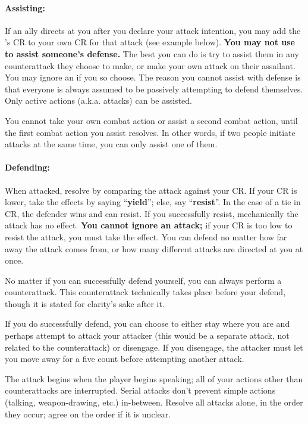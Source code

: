 \documentclass[sheet]{GL2020}
\begin{document}
\paragraph{Assisting:} If an ally directs {\bf \aAssist{}} at you after you declare your attack intention, you may add the \aAssist{}'s CR to your own CR for that attack (see example below). \textbf{You may not use \aAssist{} to assist someone's defense.} The best you can do is try to assist them in any counterattack they choose to make, or make your own attack on their assailant. You may ignore an \aAssist{} if you so choose. The reason you cannot assist with defense is that everyone is always assumed to be passively attempting to defend themselves. Only active actions (a.k.a. attacks) can be assisted.

You cannot take your own combat action or assist a second combat action, until the first combat action you assist resolves. In other words, if two people initiate attacks at the same time, you can only assist one of them.

\paragraph{Defending:} When attacked, resolve by comparing the attack against your CR. If your CR is lower, take the effects by saying ``\textbf{yield}''; else, say ``{\bf resist}''. In the case of a tie in CR, the defender wins and can resist. If you successfully resist, mechanically the attack has no effect. \textbf{You cannot ignore an attack;} if your CR is too low to resist the attack, you must take the effect. You can defend no matter how far away the attack comes from, or how many different attacks are directed at you at once. 

No matter if you can successfully defend yourself, you can always perform a counterattack.  This counterattack technically takes place before your defend, though it is stated for clarity's sake after it. 

If you do successfully defend, you can choose to either stay where you are and perhaps attempt to attack your attacker (this would be a separate  attack, not related to the counterattack) or disengage. If you disengage, the attacker must let you move away for a five count before attempting another attack.  

The attack begins when the player begins speaking; all of your actions other than counterattacks are interrupted. Serial attacks don't prevent simple actions (talking, weapon-drawing, etc.) in-between. Resolve all attacks alone, in the order they occur; agree on the order if it is unclear. 
\end{document}
